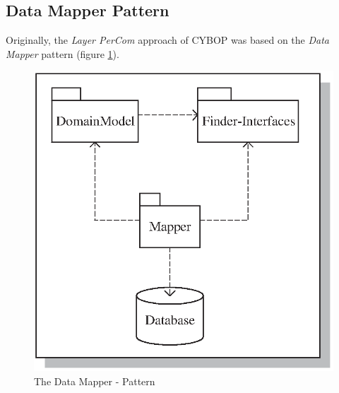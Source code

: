 \subsection{Data Mapper Pattern}
\label{data_mapper_pattern_section}

Originally, the \emph{Layer PerCom} approach of CYBOP was based on the \emph{Data Mapper} pattern
(figure \ref{fig:DataMapper}).
\begin{figure}[ht]
    \begin{center}
       \includegraphics[scale=0.6]{images/data_mapper_pattern.eps}
       \caption{The Data Mapper - Pattern \cite{enterprisepattern}}
       \label{fig:DataMapper}
    \end{center}
\end{figure}

